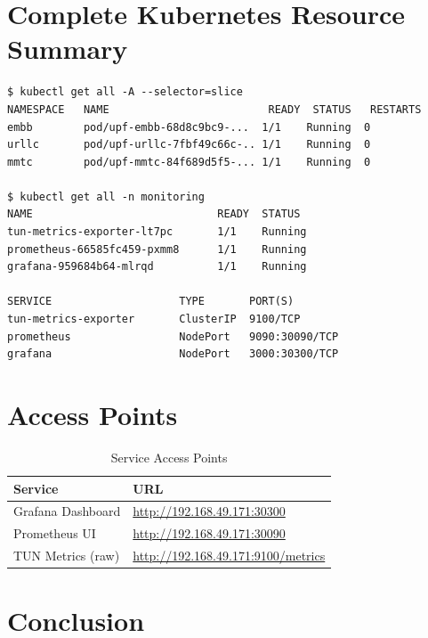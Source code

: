 \documentclass[12pt,a4paper]{article}
\begin{document}
\section{Complete Kubernetes Resource Summary}

\begin{lstlisting}[style=terminal]
$ kubectl get all -A --selector=slice
NAMESPACE   NAME                         READY  STATUS   RESTARTS
embb        pod/upf-embb-68d8c9bc9-...  1/1    Running  0
urllc       pod/upf-urllc-7fbf49c66c-.. 1/1    Running  0
mmtc        pod/upf-mmtc-84f689d5f5-... 1/1    Running  0

$ kubectl get all -n monitoring
NAME                             READY  STATUS
tun-metrics-exporter-lt7pc       1/1    Running
prometheus-66585fc459-pxmm8      1/1    Running
grafana-959684b64-mlrqd          1/1    Running

SERVICE                    TYPE       PORT(S)
tun-metrics-exporter       ClusterIP  9100/TCP
prometheus                 NodePort   9090:30090/TCP
grafana                    NodePort   3000:30300/TCP
\end{lstlisting}


\section{Access Points}

\begin{table}[H]
\centering
\begin{tabular}{ll}
\toprule
\textbf{Service} & \textbf{URL} \\
\midrule
Grafana Dashboard  & \url{http://192.168.49.171:30300} \\
Prometheus UI      & \url{http://192.168.49.171:30090} \\
TUN Metrics (raw)  & \url{http://192.168.49.171:9100/metrics} \\
\bottomrule
\end{tabular}
\caption{Service Access Points}
\end{table}


\section{Conclusion}
\end{document}
